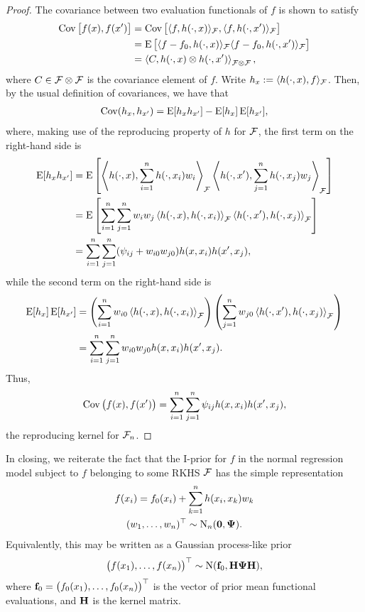 \begin{proof}
  The covariance between two evaluation functionals of $f$ is shown to satisfy 
  \begin{align*}
    \operatorname{Cov}\big[f(x),f(x')\big] 
    &= \operatorname{Cov}\big[\langle f,h(\cdot,x)\rangle_{{\mathcal F}}, \langle f,h(\cdot,x')\rangle_{{\mathcal F}} \big] \\
    &= \operatorname{E}\big[\langle f-f_0,h(\cdot,x)\rangle_{{\mathcal F}}\langle f-f_0,h(\cdot,x')\rangle_{{\mathcal F}} \big] \\
    &= \left\langle C, h(\cdot,x) \otimes h(\cdot,x') \right\rangle_{{\mathcal F} \otimes {\mathcal F}},
  \end{align*}
  where $C \in {\mathcal F}\otimes{\mathcal F}$ is the covariance element of $f$.
  Write $h_{x} := \langle h(\cdot,x),f \rangle_{{\mathcal F}}$. 
  Then, by the usual definition of covariances, we have that 
  \begin{align*}
    \operatorname{Cov}(h_x,h_{x'}) = \operatorname{E}[h_xh_{x'}] - \operatorname{E}[h_x]\operatorname{E}[h_{x'}],
  \end{align*}
  where, making use of the reproducing property of $h$ for ${\mathcal F}$, the first term on the right-hand side is
  \begin{align*}
    \operatorname{E}[h_xh_{x'}] 
    &= \operatorname{E} \left[ 
    \left\langle h(\cdot,x), \sum_{i=1}^n h(\cdot,x_i)w_i \right\rangle_{{\mathcal F}} 
    \left\langle h(\cdot,x'), \sum_{j=1}^n h(\cdot,x_j)w_j \right\rangle_{{\mathcal F}} 
    \right] \\
    &= \operatorname{E} \left[ 
    \sum_{i=1}^n\sum_{j=1}^n w_iw_j \left\langle  h(\cdot,x), h(\cdot,x_i) \right\rangle_{{\mathcal F}} 
     \left\langle h(\cdot,x'), h(\cdot,x_j)\right\rangle_{{\mathcal F}} 
    \right] \\
    &= \sum_{i=1}^n\sum_{j=1}^n (\psi_{ij} + w_{i0}w_{j0}) h(x,x_i) h(x',x_j),
  \end{align*}
  while the second term on the right-hand side is
  \begin{align*}
    \operatorname{E}[h_x]\operatorname{E}[h_{x'}]
    &= \left( \sum_{i=1}^n w_{i0} \left\langle  h(\cdot,x), h(\cdot,x_i)  \right\rangle_{{\mathcal F}} \right)
    \left( \sum_{j=1}^n w_{j0} \left\langle  h(\cdot,x'), h(\cdot,x_j)  \right\rangle_{{\mathcal F}} \right) \\
    &= \sum_{i=1}^n \sum_{j=1}^n w_{i0}w_{j0} h(x,x_i)h(x',x_j).
  \end{align*}  
  Thus,
  \[
    \operatorname{Cov}\big( f(x),f(x') \big) = \sum_{i=1}^n\sum_{j=1}^n \psi_{ij} h(x,x_i) h(x',x_j),
  \]
  the reproducing kernel for ${\mathcal F}_n$.
\end{proof}

In closing, we reiterate the fact that the I-prior for $f$ in the normal regression model subject to $f$ belonging to some RKHS ${\mathcal F}$ has the simple representation
\begin{align}\label{eq:iprior2}
  \begin{gathered}
    f(x_i) = f_0(x_i) + \sum_{k=1}^n h(x_i,x_k)w_k \\
    (w_1,\dots,w_n)^\top \sim \operatorname{N}_n({\mathbf 0},{\bm\Psi}).
  \end{gathered}
\end{align}
Equivalently, this may be written as a Gaussian process-like prior 
\begin{align}\label{eq:iprior3}
  \big(f(x_1),\dots,f(x_n) \big)^\top \sim \operatorname{N}({\mathbf f}_0,{\mathbf H}{\bm\Psi}{\mathbf H}),
\end{align}
where ${\mathbf f}_0 = \big(f_0(x_1),\dots,f_0(x_n) \big)^\top$ is the vector of prior mean functional evaluations, and ${\mathbf H}$ is the kernel matrix.